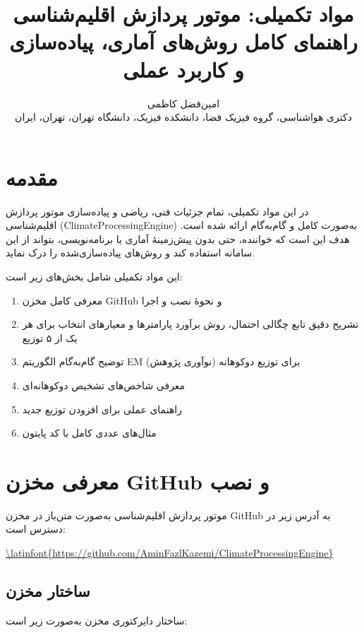 \documentclass[a4paper,12pt]{article}
\title{%
	\textbf{مواد تکمیلی: موتور پردازش اقلیم‌شناسی} \\
	\large{راهنمای کامل روش‌های آماری، پیاده‌سازی و کاربرد عملی}%
}
\author{%
	امین‌فضل کاظمی \\
	\small{دکتری هواشناسی، گروه فیزیک فضا، دانشکده فیزیک، دانشگاه تهران، تهران، ایران}%
}
\begin{document}
\maketitle

\section*{مقدمه}

در این مواد تکمیلی، تمام جزئیات فنی، ریاضی و پیاده‌سازی موتور پردازش اقلیم‌شناسی (ClimateProcessingEngine) به‌صورت کامل و گام‌به‌گام ارائه شده است. هدف این است که خواننده، حتی بدون پیش‌زمینهٔ آماری یا برنامه‌نویسی، بتواند از این سامانه استفاده کند و روش‌های پیاده‌سازی‌شده را درک نماید.

این مواد تکمیلی شامل بخش‌های زیر است:

\begin{enumerate}
\item معرفی کامل مخزن GitHub و نحوهٔ نصب و اجرا
\item تشریح دقیق تابع چگالی احتمال، روش برآورد پارامترها و معیارهای انتخاب برای هر یک از ۵ توزیع
\item توضیح گام‌به‌گام الگوریتم EM برای توزیع دوکوهانه (نوآوری پژوهش)
\item معرفی شاخص‌های تشخیص دوکوهانه‌ای
\item راهنمای عملی برای افزودن توزیع جدید
\item مثال‌های عددی کامل با کد پایتون
\end{enumerate}

\section{معرفی مخزن GitHub و نصب}

موتور پردازش اقلیم‌شناسی به‌صورت متن‌باز در مخزن GitHub به آدرس زیر در دسترس است:

\centerline{\url{\latinfont{https://github.com/AminFazlKazemi/ClimateProcessingEngine}}}

\subsection{ساختار مخزن}

ساختار دایرکتوری مخزن به‌صورت زیر است:
\end{document}
